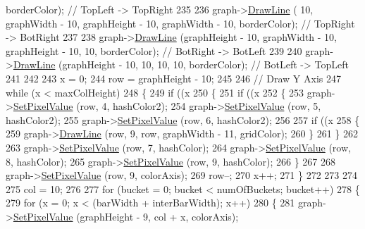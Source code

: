 \begin{DoxyCode}
      borderColor);  \textcolor{comment}{// TopLeft -> TopRight}
235 
236   graph->\hyperlink{class_k_k_b_1_1_raster_a118bf0fa32356ddea42f579c044c65cd}{DrawLine} (              10, graphWidth - 10, graphHeight - 10, graphWidth - 10, 
      borderColor);  \textcolor{comment}{// TopRight -> BotRight}
237 
238   graph->\hyperlink{class_k_k_b_1_1_raster_a118bf0fa32356ddea42f579c044c65cd}{DrawLine} (graphHeight - 10, graphWidth - 10, graphHeight - 10,              10, 
      borderColor);  \textcolor{comment}{// BotRight -> BotLeft}
239 
240   graph->\hyperlink{class_k_k_b_1_1_raster_a118bf0fa32356ddea42f579c044c65cd}{DrawLine} (graphHeight - 10,              10,               10,              10, 
      borderColor);  \textcolor{comment}{// BotLeft -> TopLeft}
241 
242 
243   x = 0;
244   row = graphHeight - 10;
245   
246   \textcolor{comment}{// Draw Y Axis}
247   \textcolor{keywordflow}{while}  (x < maxColHeight)
248   \{
249     \textcolor{keywordflow}{if}  ((x %
250     \{
251       \textcolor{keywordflow}{if}  ((x %
252       \{
253         graph->\hyperlink{class_k_k_b_1_1_raster_a5ddb8bd069dc64241941b0b011af8667}{SetPixelValue} (row, 4, hashColor2);
254         graph->\hyperlink{class_k_k_b_1_1_raster_a5ddb8bd069dc64241941b0b011af8667}{SetPixelValue} (row, 5, hashColor2);
255         graph->\hyperlink{class_k_k_b_1_1_raster_a5ddb8bd069dc64241941b0b011af8667}{SetPixelValue} (row, 6, hashColor2);
256 
257         \textcolor{keywordflow}{if}  ((x %
258         \{
259           graph->\hyperlink{class_k_k_b_1_1_raster_a118bf0fa32356ddea42f579c044c65cd}{DrawLine} (row, 9, row, graphWidth - 11, gridColor);
260         \}
261       \}
262 
263       graph->\hyperlink{class_k_k_b_1_1_raster_a5ddb8bd069dc64241941b0b011af8667}{SetPixelValue} (row, 7, hashColor);
264       graph->\hyperlink{class_k_k_b_1_1_raster_a5ddb8bd069dc64241941b0b011af8667}{SetPixelValue} (row, 8, hashColor);
265       graph->\hyperlink{class_k_k_b_1_1_raster_a5ddb8bd069dc64241941b0b011af8667}{SetPixelValue} (row, 9, hashColor);
266     \}
267 
268     graph->\hyperlink{class_k_k_b_1_1_raster_a5ddb8bd069dc64241941b0b011af8667}{SetPixelValue} (row, 9, colorAxis);
269     row--;
270     x++;
271   \}
272 
273 
274 
275   col = 10;
276 
277   \textcolor{keywordflow}{for}  (bucket = 0;  bucket < numOfBuckets;  bucket++)
278   \{
279     \textcolor{keywordflow}{for}  (x = 0;  x < (barWidth + interBarWidth);  x++)
280     \{
281       graph->\hyperlink{class_k_k_b_1_1_raster_a5ddb8bd069dc64241941b0b011af8667}{SetPixelValue} (graphHeight - 9, col + x, colorAxis);

\end{DoxyCode}
